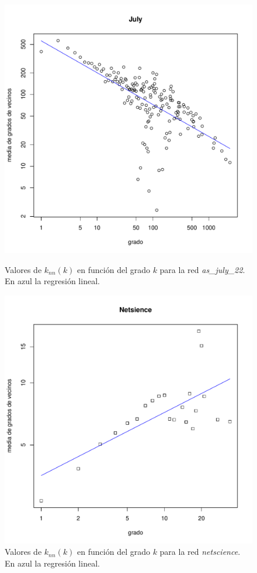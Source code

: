 \documentclass{article}
\begin{document}
\begin{figure}[!htb]
\centering
   \begin{minipage}{0.3\textwidth}
	\centering
	\includegraphics[width=.7\linewidth]{Imagenes_P4/ej42}
	\caption{Valores de $k_{nn}(k)$ en función del grado $k$ para la red \textit{as\_july\_22}. En azul la regresión lineal.}
	\label{pt4july}
   \end{minipage}
   \hspace{6px}
   \begin{minipage}{0.3\textwidth}
	\centering
	\includegraphics[width=.7\linewidth]{Imagenes_P4/ej44}
	\caption{Valores de $k_{nn}(k)$ en función del grado $k$ para la red \textit{netscience}. En azul la regresión lineal.}
	\label{pt4netscience}
   \end{minipage}
\end{figure}
\end{document}
